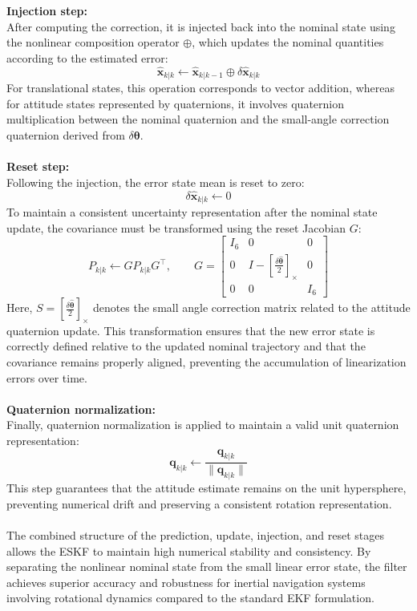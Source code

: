 \\ \\
\textbf{Injection step:} \\ \noindent
After computing the correction, it is injected back into the nominal state using the nonlinear composition operator $\oplus$, which updates the nominal quantities according to the estimated error:
$$
    \hat{\mathbf{x}}_{k|k} \leftarrow \hat{\mathbf{x}}_{k|k-1} \oplus \delta\hat{\mathbf{x}}_{k|k}
$$
For translational states, this operation corresponds to vector addition, whereas for attitude states represented by quaternions, it involves quaternion multiplication between the nominal quaternion and the small-angle correction quaternion derived from $\delta\boldsymbol{\theta}$.
\\ \\
\textbf{Reset step:} \\ \noindent
Following the injection, the error state mean is reset to zero:
$$
    \delta\hat{\mathbf{x}}_{k|k} \leftarrow 0
$$
To maintain a consistent uncertainty representation after the nominal state update, the covariance must be transformed using the reset Jacobian $G$:
$$
    P_{k|k} \leftarrow G P_{k|k} G^\top, \qquad 
    G =
    \begin{bmatrix}
        I_6 & 0 & 0 \\
        0 & I - [\tfrac{\delta\hat{\boldsymbol{\theta}}}{2}]_\times & 0 \\
        0 & 0 & I_6
    \end{bmatrix}
$$
Here, $S = [\tfrac{\delta\hat{\boldsymbol{\theta}}}{2}]_\times$ denotes the small angle correction matrix related to the attitude quaternion update. This transformation ensures that the new error state is correctly defined relative to the updated nominal trajectory and that the covariance remains properly aligned, preventing the accumulation of linearization errors over time.
\\ \\
\textbf{Quaternion normalization:} \\ \noindent
Finally, quaternion normalization is applied to maintain a valid unit quaternion representation:
$$
    \mathbf{q}_{k|k} \leftarrow \frac{\mathbf{q}_{k|k}}{\|\mathbf{q}_{k|k}\|}
$$
This step guarantees that the attitude estimate remains on the unit hypersphere, preventing numerical drift and preserving a consistent rotation representation.
\\ \\
The combined structure of the prediction, update, injection, and reset stages allows the ESKF to maintain high numerical stability and consistency. By separating the nonlinear nominal state from the small linear error state, the filter achieves superior accuracy and robustness for inertial navigation systems involving rotational dynamics compared to the standard EKF formulation.



